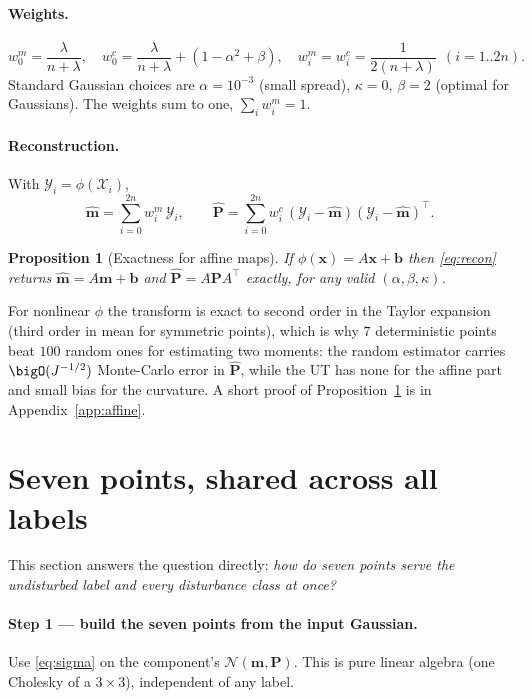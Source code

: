 \documentclass[11pt]{article}
\newcommand{\bx}{\bm{x}}
\newcommand{\bm}[1]{\boldsymbol{#1}}
\newtheorem{proposition}{Proposition}
\begin{document}
\paragraph{Weights.}
\begin{equation}
\label{eq:weights}
w_0^m=\frac{\lambda}{n+\lambda},\quad
w_0^c=\frac{\lambda}{n+\lambda}+(1-\alpha^2+\beta),\quad
w_i^m=w_i^c=\frac{1}{2(n+\lambda)}\ \ (i=1..2n).
\end{equation}
Standard Gaussian choices are $\alpha=10^{-3}$ (small spread), $\kappa=0$, $\beta=2$
(optimal for Gaussians). The weights sum to one, $\sum_i w_i^m=1$.

\paragraph{Reconstruction.} With $\mathcal Y_i=\phi(\mathcal X_i)$,
\begin{equation}
\label{eq:recon}
\hat{\bm m}=\sum_{i=0}^{2n} w_i^m\,\mathcal Y_i,\qquad
\hat{\bm P}=\sum_{i=0}^{2n} w_i^c\,(\mathcal Y_i-\hat{\bm m})(\mathcal Y_i-\hat{\bm m})^\top .
\end{equation}

\begin{proposition}[Exactness for affine maps]
\label{prop:affine}
If $\phi(\bx)=A\bx+\bm b$ then \eqref{eq:recon} returns $\hat{\bm m}=A\bm m+\bm b$ and
$\hat{\bm P}=A\bm P A^\top$ exactly, for any valid $(\alpha,\beta,\kappa)$.
\end{proposition}
\noindent For nonlinear $\phi$ the transform is exact to second order in the Taylor
expansion (third order in mean for symmetric points), which is why $7$ deterministic
points beat $100$ random ones for estimating two moments: the random estimator carries
$\bigO(J^{-1/2})$ Monte-Carlo error in $\hat{\bm P}$, while the UT has none for the
affine part and small bias for the curvature. A short proof of
Proposition~\ref{prop:affine} is in Appendix~\ref{app:affine}.

\section{Seven points, shared across all labels}
\label{sec:shared}

This section answers the question directly: \emph{how do seven points serve the
undisturbed label and every disturbance class at once?}

\paragraph{Step 1 --- build the seven points from the input Gaussian.} Use
\eqref{eq:sigma} on the component's $\mathcal N(\bm m,\bm P)$. This is pure linear
algebra (one Cholesky of a $3\times3$), independent of any label.
\end{document}
